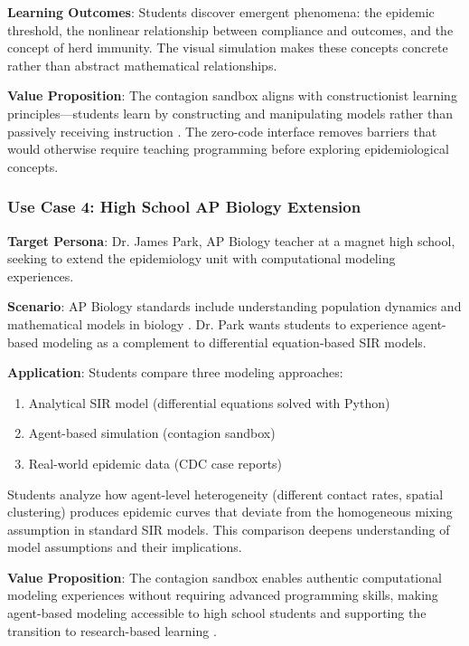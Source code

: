 \textbf{Learning Outcomes}: Students discover emergent phenomena: the epidemic threshold, the nonlinear relationship between compliance and outcomes, and the concept of herd immunity. The visual simulation makes these concepts concrete rather than abstract mathematical relationships.

\textbf{Value Proposition}: The contagion sandbox aligns with constructionist learning principles---students learn by constructing and manipulating models rather than passively receiving instruction \cite{papert1980mindstorms}. The zero-code interface removes barriers that would otherwise require teaching programming before exploring epidemiological concepts.

\subsubsection{Use Case 4: High School AP Biology Extension}

\textbf{Target Persona}: Dr. James Park, AP Biology teacher at a magnet high school, seeking to extend the epidemiology unit with computational modeling experiences.

\textbf{Scenario}: AP Biology standards include understanding population dynamics and mathematical models in biology \cite{collegeboard2019ap}. Dr. Park wants students to experience agent-based modeling as a complement to differential equation-based SIR models.

\textbf{Application}: Students compare three modeling approaches:
\begin{enumerate}
    \item Analytical SIR model (differential equations solved with Python)
    \item Agent-based simulation (contagion sandbox)
    \item Real-world epidemic data (CDC case reports)
\end{enumerate}

Students analyze how agent-level heterogeneity (different contact rates, spatial clustering) produces epidemic curves that deviate from the homogeneous mixing assumption in standard SIR models. This comparison deepens understanding of model assumptions and their implications.

\textbf{Value Proposition}: The contagion sandbox enables authentic computational modeling experiences without requiring advanced programming skills, making agent-based modeling accessible to high school students and supporting the transition to research-based learning \cite{wilensky2015agent}.

